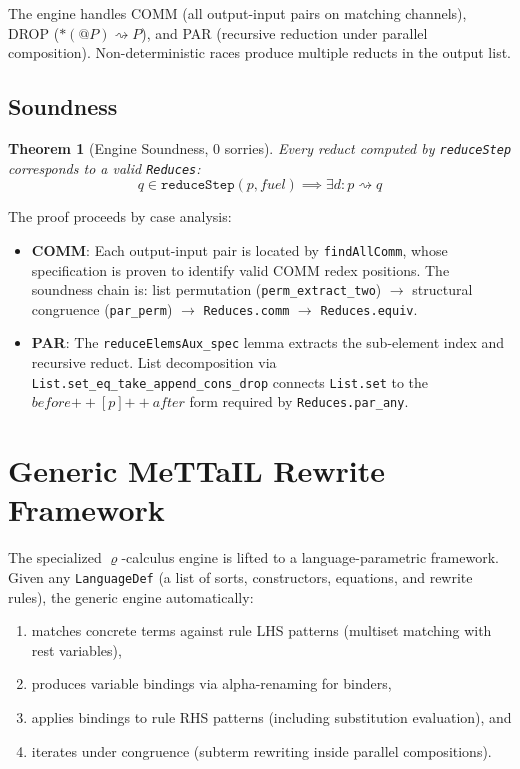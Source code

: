 \documentclass[]{article}
\newtheorem{theorem}{Theorem}
\newcommand{\code}[1]{\texttt{#1}}
\newcommand{\rhocalc}{\ensuremath{\varrho}}
\begin{document}
The engine handles COMM (all output-input pairs on matching channels), DROP
($*(@P) \rightsquigarrow P$), and PAR (recursive reduction under parallel composition).
Non-deterministic races produce multiple reducts in the output list.

\subsection{Soundness}

\begin{theorem}[Engine Soundness, 0 sorries]
Every reduct computed by \code{reduceStep} corresponds to a valid \code{Reduces}:
$$q \in \code{reduceStep}(p, \mathit{fuel}) \implies \exists d : p \rightsquigarrow q$$
\end{theorem}

The proof proceeds by case analysis:
\begin{itemize}
\item \textbf{COMM}: Each output-input pair is located by \code{findAllComm}, whose
  specification is proven to identify valid COMM redex positions.  The soundness chain
  is: list permutation (\code{perm\_extract\_two}) $\to$ structural congruence
  (\code{par\_perm}) $\to$ \code{Reduces.comm} $\to$ \code{Reduces.equiv}.
\item \textbf{PAR}: The \code{reduceElemsAux\_spec} lemma extracts the sub-element
  index and recursive reduct.  List decomposition via
  \code{List.set\_eq\_take\_append\_cons\_drop} connects \code{List.set} to the
  $\mathit{before} \mathbin{+\!\!+} [p] \mathbin{+\!\!+} \mathit{after}$ form
  required by \code{Reduces.par\_any}.
\end{itemize}

\section{Generic MeTTaIL Rewrite Framework}

The specialized \rhocalc{}-calculus engine is lifted to a language-parametric
framework.  Given any \code{LanguageDef} (a list of sorts, constructors, equations,
and rewrite rules), the generic engine automatically:
\begin{enumerate}
\item matches concrete terms against rule LHS patterns (multiset matching with rest variables),
\item produces variable bindings via alpha-renaming for binders,
\item applies bindings to rule RHS patterns (including substitution evaluation), and
\item iterates under congruence (subterm rewriting inside parallel compositions).
\end{enumerate}
\end{document}
